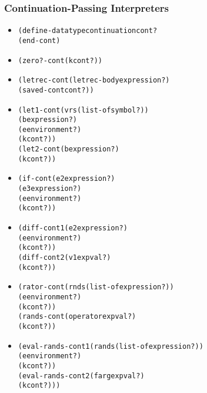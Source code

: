 \documentclass{beamer}
\begin{document}
\begin{frame}[fragile]
\frametitle{Continuation-Passing Interpreters}
\begin{tiny}
\begin{itemize}
\item<1->
\begin{alltt}
(define-datatype continuation cont?
  (end-cont)
\end{alltt}

\item<2->
\begin{alltt}
  (zero?-cont (k cont?))
\end{alltt}

\item<3->
\begin{alltt}
  (letrec-cont (letrec-body expression?)
               (saved-cont cont?))
\end{alltt}

\item<4->
\begin{alltt}
  (let1-cont (vrs (list-of symbol?))
             (b expression?)
             (e environment?)
             (k cont?))
  (let2-cont (b expression?)
             (k cont?))
\end{alltt}

\item<5->
\begin{alltt}
  (if-cont (e2 expression?)
           (e3 expression?)
           (e environment?)
           (k cont?))
\end{alltt}

\item<6->
\begin{alltt}
  (diff-cont1 (e2 expression?)
              (e environment?)
              (k cont?))
  (diff-cont2 (v1 expval?)
              (k cont?))
\end{alltt}

\item<7->
\begin{alltt}
  (rator-cont (rnds (list-of expression?))
              (e environment?)
              (k cont?))
  (rands-cont (operator expval?)
              (k cont?))
\end{alltt}

\item<8->
\begin{alltt}
  (eval-rands-cont1 (rands (list-of expression?))
                    (e environment?)
                    (k cont?))
  (eval-rands-cont2 (farg expval?)
                    (k cont?)))
\end{alltt}

\end{itemize}
\end{tiny}
\end{frame}
\end{document}
